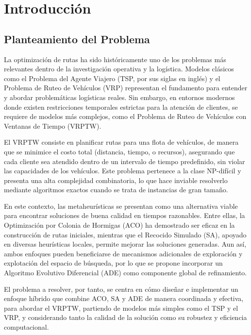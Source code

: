 \documentclass[12pt,titlepage,twoside,openright]{book}
\begin{document}
\setlength{\parindent}{2em}
\setlength{\parskip}{1.5ex}


\newcommand{\tab}{\hspace*{1cm}}

\chapter{Introducción}
\label{cap:introduccion}

\section{Planteamiento del Problema}

La optimización de rutas ha sido históricamente uno de los problemas más relevantes dentro de la investigación operativa y la logística. Modelos clásicos como el Problema del Agente Viajero (TSP, por sus siglas en inglés) y el Problema de Ruteo de Vehículos (VRP) representan el fundamento para entender y abordar problemáticas logísticas reales. Sin embargo, en entornos modernos donde existen restricciones temporales estrictas para la atención de clientes, se requiere de modelos más complejos, como el Problema de Ruteo de Vehículos con Ventanas de Tiempo (VRPTW).

El VRPTW consiste en planificar rutas para una flota de vehículos, de manera que se minimice el costo total (distancia, tiempo, o recursos), asegurando que cada cliente sea atendido dentro de un intervalo de tiempo predefinido, sin violar las capacidades de los vehículos. Este problema pertenece a la clase NP-difícil y presenta una alta complejidad combinatoria, lo que hace inviable resolverlo mediante algoritmos exactos cuando se trata de instancias de gran tamaño.

En este contexto, las metaheurísticas se presentan como una alternativa viable para encontrar soluciones de buena calidad en tiempos razonables. Entre ellas, la Optimización por Colonia de Hormigas (ACO) ha demostrado ser eficaz en la construcción de rutas iniciales, mientras que el Recocido Simulado (SA), apoyado en diversas heurísticas locales, permite mejorar las soluciones generadas. Aun así, ambos enfoques pueden beneficiarse de mecanismos adicionales de exploración y explotación del espacio de búsqueda, por lo que se propone incorporar un Algoritmo Evolutivo Diferencial (ADE) como componente global de refinamiento.

El problema a resolver, por tanto, se centra en cómo diseñar e implementar un enfoque híbrido que combine ACO, SA y ADE de manera coordinada y efectiva, para abordar el VRPTW, partiendo de modelos más simples como el TSP y el VRP, y considerando tanto la calidad de la solución como su robustez y eficiencia computacional.
\end{document}
